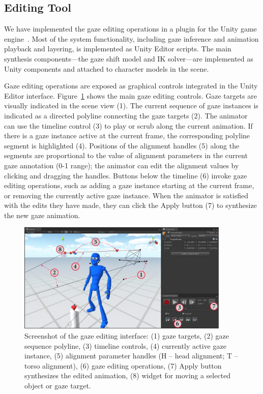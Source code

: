 \subsection{Editing Tool}

We have implemented the gaze editing operations in a plugin for the Unity game engine~\citep{unity3d}. Most of the system functionality, including gaze inference and animation playback and layering, is implemented as Unity Editor scripts. The main synthesis components---the gaze shift model and IK solver---are implemented as Unity components and attached to character models in the scene.

Gaze editing operations are exposed as graphical controls integrated in the Unity Editor interface. Figure~\ref{fig:GazeEditingTool} shows the main gaze editing controls. Gaze targets are visually indicated in the scene view (1). The current sequence of gaze instances is indicated as a directed polyline connecting the gaze targets (2).  The animator can use the timeline control (3) to play or scrub along the current animation. If there is a gaze instance active at the current frame, the corresponding polyline segment is highlighted (4). Positions of the alignment handles (5) along the segments are proportional to the value of alignment parameters in the current gaze annotation (0-1 range); the animator can edit the alignment values by clicking and dragging the handles. Buttons below the timeline (6) invoke gaze editing operations, such as adding a gaze instance starting at the current frame, or removing the currently active gaze instance. When the animator is satisfied with the edits they have made, they can click the Apply button (7) to synthesize the new gaze animation.

\begin{figure}
\centering
\includegraphics[width=0.9\textwidth]{gazeauthoring/Figures/GazeEditingTool.pdf}
\caption{Screenshot of the gaze editing interface: (1) gaze targets, (2) gaze sequence polyline, (3) timeline controls, (4) currently active gaze instance, (5) alignment parameter handles (H -- head alignment; T -- torso alignment), (6) gaze editing operations, (7) Apply button synthesizes the edited animation, (8) widget for moving a selected object or gaze target.}
\label{fig:GazeEditingTool}
\end{figure}

